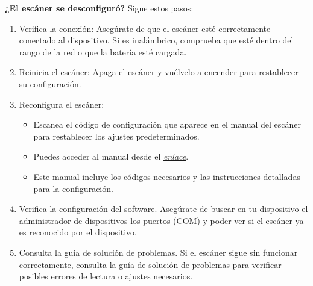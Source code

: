 \textbf{¿El escáner se desconfiguró?} Sigue estos pasos:
\begin{enumerate}
    \item Verifica la conexión: Asegúrate de que el escáner esté correctamente conectado al dispositivo. Si es inalámbrico, comprueba que esté dentro del rango de la red o que la batería esté cargada. 

    \item Reinicia el escáner: Apaga el escáner y vuélvelo a encender para restablecer su configuración. 

    \item Reconfigura el escáner: 
    \begin{itemize}
        \item Escanea el código de configuración que aparece en el manual del escáner para restablecer los ajustes predeterminados.
        \item Puedes acceder al manual desde el 
        \href{https://drive.google.com/file/d/1OsTJD1-Hbvdd9wIGknSJqKVfENMQDajR/view?usp=sharing.}{\emph{enlace}}. 
        \item Este manual incluye los códigos necesarios y las instrucciones detalladas para la configuración.
    \end{itemize}
    \item Verifica la configuración del software. Asegúrate de buscar en tu dispositivo el administrador de dispositivos los puertos (COM) y poder ver si el escáner ya es reconocido por el dispositivo.

    \item Consulta la guía de solución de problemas. Si el escáner sigue sin funcionar correctamente, consulta la guía de solución de problemas para verificar posibles errores de lectura o ajustes necesarios. 
\end{enumerate}